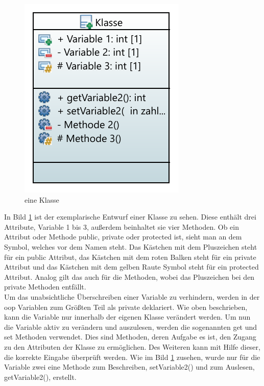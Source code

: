 \begin{figure}[H]
	\centering
	\includegraphics[scale=1]{bilder/pdfvorlagen/model}
	
	\caption[eine Klasse]{eine Klasse}
	\label{fig:eineklasse}
\end{figure}
 In Bild  \ref{fig:eineklasse} ist der exemplarische Entwurf einer Klasse zu sehen. Diese enthält drei Attribute, Variable 1 bis 3, außerdem beinhaltet sie vier Methoden. Ob ein Attribut oder Methode \glqq public\grqq{},  \glqq private\grqq{} oder \glqq protected\grqq{} ist, sieht man an dem Symbol, welches vor dem Namen steht. Das Kästchen mit dem Pluszeichen steht für ein \glqq public\grqq{} Attribut, das Kästchen mit dem roten Balken steht für ein   \glqq private\grqq{} Attribut und das Kästchen mit dem gelben Raute Symbol steht für ein \glqq protected\grqq{} Attribut. Analog gilt das auch für die Methoden, wobei das Pluszeichen bei den \glqq private\grqq{} Methoden entfällt. \\
 Um das unabsichtliche Überschreiben einer Variable zu verhindern, werden in der \acl{oop} Variablen zum Größten Teil als \glqq private\grqq{} deklariert. Wie oben beschrieben, kann die Variable nur innerhalb der eigenen Klasse verändert werden. Um nun die Variable aktiv zu verändern und auszulesen, werden die sogenannten \glqq get\grqq{} und \glqq set\grqq{} Methoden verwendet. Dies sind Methoden, deren Aufgabe es ist, den Zugang zu den Attributen der Klasse zu ermöglichen. Des Weiteren kann mit Hilfe dieser, die korrekte Eingabe überprüft werden. Wie im Bild \ref{fig:eineklasse} zusehen, wurde nur für die Variable zwei eine Methode zum Beschreiben, \glqq setVariable2()\grqq{} und zum Auslesen, \glqq getVariable2()\grqq{}, erstellt.\\
